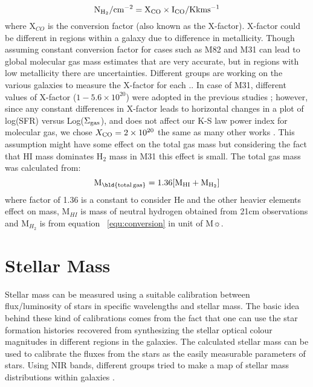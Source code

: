 \documentclass[useAMS,usenatbib]{mn2e}
\newcommand \um    {$\mu$m\ }
\begin{document}
\begin{equation}
\label{equ:conversion}
\rm N_{H_2}/\rm cm^{-2} = X_{CO} \times I_{CO}/\rm K km s^{-1}
\end{equation}
where X$_{CO}$ is the conversion factor (also known as the X-factor). X-factor could be different in regions within a galaxy due to difference in metallicity. Though assuming constant conversion factor for cases such as M82 and M31 can lead to global molecular gas mass estimates that are very accurate,  but in regions with low metallicity there are uncertainties. Different groups are working on the various galaxies to measure the X-factor for each \citep{Wilson95, Bosselli02, Bolato13}.. In case of M31, different values of X-factor ($1-5.6 \times 10^{20}$) were adopted in the previous studies \citep[e.g.][]{Ford13, Bolato13, Leroy11, Bolato08, Nieten06, Sofue94, Strong88}; however, since any constant differences in X-factor leads to horizontal changes in a plot of log(SFR) versus Log($\Sigma_{\rm {gas}}$), and does not affect our K-S law power index for molecular gas,  we chose $X_{\rm {CO}}= 2 \times 10^{20}$  the same as many other works \citep[e.g.][]{Ford13, Smith12}. This assumption might have some effect on the total gas mass but considering the fact that HI mass dominates H$_2$ mass in M31 this effect is small.
The total gas mass was calculated from:
\begin{equation}
\label{equ:total_gas}
\rm M_{\rm \bld {total \, gas}} = 1.36[M_{HI}+M_{H_2}]
\end{equation}
where  factor of 1.36 is a constant to consider He and the other heavier elements effect on mass, M$_{HI}$ is mass of neutral hydrogen obtained from 21cm observations and M$_{H_2}$ is from equation ~\ref{equ:conversion} in unit of M$\sun$.

\section{Stellar Mass}
\label{starmass}
Stellar mass can be measured using a suitable calibration between flux/luminosity of stars in specific wavelengths and stellar mass. The basic idea behind these kind of calibrations comes from the fact that one can use the star formation histories recovered from synthesizing the stellar optical colour magnitudes in different regions in the galaxies. The calculated stellar mass can be used  to calibrate the fluxes from the stars as the easily measurable parameters of stars. Using NIR bands, different groups tried to make a map of stellar mass distributions within galaxies \citep[e.g.,][]{Elmgreen84}.%
\end{document}
